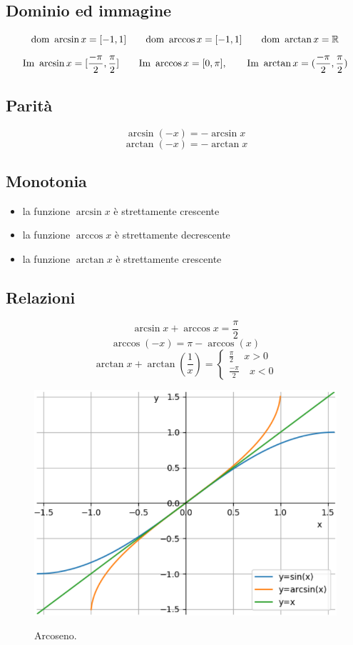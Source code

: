 \subsection{Dominio ed immagine}
\[\text{dom } \arcsin x = [-1,1] \qquad \text{dom } \arccos x = [-1,1] \qquad \text{dom } \arctan x = \mathbb{R}\]
\[\text{Im } \arcsin x = [\frac{-\pi}{2}, \frac{\pi}{2}] \qquad \text{Im } \arccos x = [0, \pi], \qquad \text{Im } \arctan x = (\frac{-\pi}{2}, \frac{\pi}{2})\]

\subsection{Parità}
\[\arcsin(-x)=-\arcsin x\]
\[\arctan(-x)=-\arctan x\]

\subsection{Monotonia}
\begin{itemize}
\item la funzione $\arcsin x$ è strettamente crescente
\item la funzione $\arccos x$ è strettamente decrescente
\item la funzione $\arctan x$ è strettamente crescente
\end{itemize}

\subsection{Relazioni}
\[\arcsin x + \arccos x = \frac{\pi}{2}\]
\[\arccos(-x) = \pi - \arccos(x)\]
\[\arctan x + \arctan (\frac{1}{x}) = \begin{cases}
 \frac{\pi}{2} \quad x>0 \\
 \frac{-\pi}{2} \quad x<0
\end{cases}\]

\begin{figure}[H]
{\includegraphics[width=.90\linewidth]{gfx/4/arcoseno.png}}
\caption{Arcoseno.}\label{fig:arcoseno}
\end{figure}

